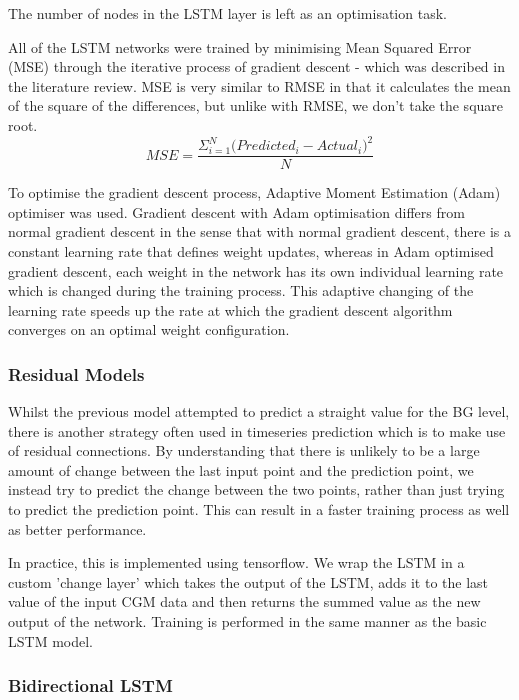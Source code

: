       The number of nodes in the LSTM layer is left as an optimisation task.

      All of the LSTM networks were trained by minimising Mean Squared Error (MSE) through the iterative process of gradient descent - which was described in the literature review. MSE is very similar to RMSE in that it calculates the mean of the square of the differences, but unlike with RMSE, we don't take the square root. \[MSE = \frac{\Sigma_{i=1}^{N}{\Big(Predicted_i - Actual_i\Big)^2}}{N}\]

      To optimise the gradient descent process, Adaptive Moment Estimation (Adam) \cite{adam} optimiser was used. Gradient descent with Adam optimisation differs from normal gradient descent in the sense that with normal gradient descent, there is a constant learning rate that defines weight updates, whereas in Adam optimised gradient descent, each weight in the network has its own individual learning rate which is changed during the training process. This adaptive changing of the learning rate speeds up the rate at which the gradient descent algorithm converges on an optimal weight configuration.

      \subsubsection{Residual Models}

      Whilst the previous model attempted to predict a straight value for the BG level, there is another strategy often used in timeseries prediction which is to make use of residual connections. By understanding that there is unlikely to be a large amount of change between the last input point and the prediction point, we instead try to predict the change between the two points, rather than just trying to predict the prediction point. This can result in a faster training process as well as better performance. 
      
      In practice, this is implemented using tensorflow. We wrap the LSTM in a custom 'change layer' which takes the output of the LSTM, adds it to the last value of the input CGM data and then returns the summed value as the new output of the network. Training is performed in the same manner as the basic LSTM model.

      \subsubsection{Bidirectional LSTM}

